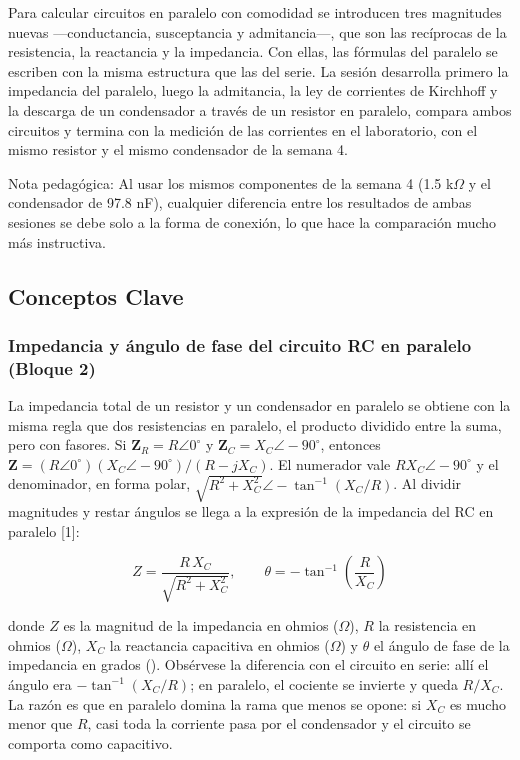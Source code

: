 \documentclass[11pt,letterpaper]{article}
\begin{document}
Para calcular circuitos en paralelo con comodidad se introducen tres magnitudes nuevas ---conductancia, susceptancia y admitancia---, que son las recíprocas de la resistencia, la reactancia y la impedancia. Con ellas, las fórmulas del paralelo se escriben con la misma estructura que las del serie. La sesión desarrolla primero la impedancia del paralelo, luego la admitancia, la ley de corrientes de Kirchhoff y la descarga de un condensador a través de un resistor en paralelo, compara ambos circuitos y termina con la medición de las corrientes en el laboratorio, con el mismo resistor y el mismo condensador de la semana 4.

\begin{nota}{Nota pedagógica:}
Al usar los mismos componentes de la semana 4 (1.5 k\ensuremath{\Omega} y el condensador de 97.8 nF), cualquier diferencia entre los resultados de ambas sesiones se debe solo a la forma de conexión, lo que hace la comparación mucho más instructiva.
\end{nota}

\subsection{Conceptos Clave}

\subsubsection{Impedancia y ángulo de fase del circuito RC en paralelo (Bloque 2)}

La impedancia total de un resistor y un condensador en paralelo se obtiene con la misma regla que dos resistencias en paralelo, el producto dividido entre la suma, pero con fasores. Si $\mathbf{Z}_R = R \angle 0^\circ$ y $\mathbf{Z}_C = X_C \angle -90^\circ$, entonces $\mathbf{Z} = (R \angle 0^\circ)(X_C \angle -90^\circ) / (R - jX_C)$. El numerador vale $R X_C \angle -90^\circ$ y el denominador, en forma polar, $\sqrt{R^2 + X_C^2} \angle -\tan^{-1}(X_C/R)$. Al dividir magnitudes y restar ángulos se llega a la expresión de la impedancia del RC en paralelo [1]:

\begin{equation}
  Z = \frac{R\,X_C}{\sqrt{R^{2} + X_C^{2}}}, \qquad \theta = -\tan^{-1}\!\left(\frac{R}{X_C}\right)
\end{equation}

donde $Z$ es la magnitud de la impedancia en ohmios (\ensuremath{\Omega}), $R$ la resistencia en ohmios (\ensuremath{\Omega}), $X_C$ la reactancia capacitiva en ohmios (\ensuremath{\Omega}) y $\theta$ el ángulo de fase de la impedancia en grados (\textdegree{}). Obsérvese la diferencia con el circuito en serie: allí el ángulo era $-\tan^{-1}(X_C/R)$; en paralelo, el cociente se invierte y queda $R/X_C$. La razón es que en paralelo domina la rama que menos se opone: si $X_C$ es mucho menor que $R$, casi toda la corriente pasa por el condensador y el circuito se comporta como capacitivo.
\end{document}
